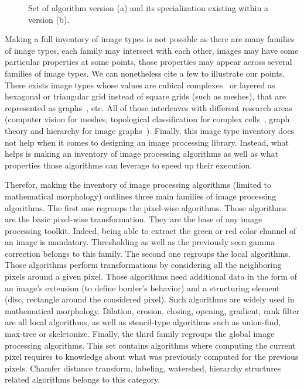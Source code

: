 \begin{figure}[htbp]
  \centering
  \hfil
  \caption{Set of algorithm version (a) and its specialization existing within a version (b).}
  \label{fig:image.version.vs.specialization}
\end{figure}

Making a full inventory of image types is not possible as there are many families of image types, each family may
intersect with each other, images may have some particular properties at some points, those properties may appear across
several families of image types. We can nonetheless cite a few to illustrate our points. There exists image types whose
values are cubical complexes~\parencite{ziou.2002.cubical-complex} or layered as hexagonal or triangular grid instead of
square grids (such as meshes), that are represented as graphs~\parencite{meyer.2009.ismm}, etc. All of those interleaves
with different research areas (computer vision for meshes, topological classification for complex
cells~\parencite{movn.20.cviu,allili.2001.cubical}, graph theory and hierarchy for image
graphs~\parencite{carlinet.2014.tip,carlinet.2015.tip,perret.2019.higra}). Finally, this image type inventory does not
help when it comes to designing an image processing library. Instead, what helps is making an inventory of image
processing algorithms as well as what properties those algorithms can leverage to speed up their execution.

Therefor, making the inventory of image processing algorithms (limited to mathematical morphology) outlines three main
families of image processing algorithms. The first one regroups the pixel-wise algorithms. Those algorithms are the
basic pixel-wise transformation. They are the base of any image processing toolkit. Indeed, being able to extract the
green or red color channel of an image is mandatory. Thresholding as well as the previously seen gamma correction
belongs to this family. The second one regroups the local algorithms. Those algorithms perform transformations by
considering all the neighboring pixels around a given pixel. Those algorithms need additional data in the form of an
image's extension (to define border's behavior) and a structuring element (disc, rectangle around the considered pixel).
Such algorithms are widely used in mathematical morphology. Dilation, erosion, closing, opening, gradient, rank filter
are all local algorithms, as well as stencil-type algorithms such as union-find, max-tree or skeletonize. Finally, the
third family regroups the global image processing algorithms. This set contains algorithms where computing the current
pixel requires to knowledge about what was previously computed for the previous pixels. Chamfer distance transform,
labeling, watershed, hierarchy structures related algorithms belongs to this category.


